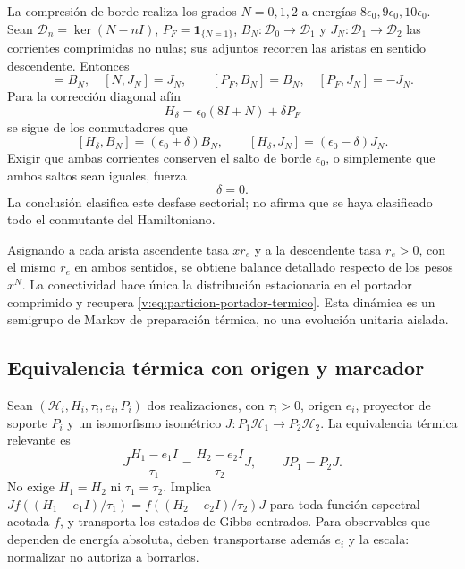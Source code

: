 La compresión de borde realiza los grados $N=0,1,2$ a energías
$8\epsilon_0,9\epsilon_0,10\epsilon_0$. Sean
$\mathcal D_n=\ker(N-nI)$,
$P_F=\mathbf1_{\{N=1\}}$,
$B_N:\mathcal D_0\to\mathcal D_1$ y
$J_N:\mathcal D_1\to\mathcal D_2$ las corrientes comprimidas no nulas;
sus adjuntos recorren las aristas en sentido descendente. Entonces
\begin{equation}
 [N,B_N]=B_N,\quad [N,J_N]=J_N,\qquad
 [P_F,B_N]=B_N,\quad [P_F,J_N]=-J_N.
 \label{v:eq:conmutadores-corrientes-termicas}
\end{equation}
Para la corrección diagonal afín
\[
 H_\delta=\epsilon_0(8I+N)+\delta P_F
\]
se sigue de los conmutadores que
\[
 [H_\delta,B_N]=(\epsilon_0+\delta)B_N,
 \qquad
 [H_\delta,J_N]=(\epsilon_0-\delta)J_N.
\]
Exigir que ambas corrientes conserven el salto de borde $\epsilon_0$, o
simplemente que ambos saltos sean iguales, fuerza
\begin{equation}
 \delta=0.
 \label{v:eq:rigidez-desfase-corrientes}
\end{equation}
La conclusión clasifica este desfase sectorial; no afirma que se haya
clasificado todo el conmutante del Hamiltoniano.

Asignando a cada arista ascendente tasa $xr_e$ y a la descendente tasa
$r_e>0$, con el mismo $r_e$ en ambos sentidos, se obtiene balance detallado
respecto de los pesos $x^N$. La conectividad hace única la distribución
estacionaria en el portador comprimido y recupera
\eqref{v:eq:particion-portador-termico}. Esta dinámica es un semigrupo de
Markov de preparación térmica, no una evolución unitaria aislada.

\subsection{Equivalencia térmica con origen y marcador}

Sean $(\mathscr H_i,H_i,\tau_i,e_i,P_i)$ dos realizaciones, con
$\tau_i>0$, origen $e_i$, proyector de soporte $P_i$ y un isomorfismo
isométrico $J:P_1\mathscr H_1\to P_2\mathscr H_2$. La equivalencia térmica
relevante es
\begin{equation}
 J\frac{H_1-e_1I}{\tau_1}
 =\frac{H_2-e_2I}{\tau_2}J,\qquad
 JP_1=P_2J.
 \label{v:eq:equivalencia-termica-centrada}
\end{equation}
No exige $H_1=H_2$ ni $\tau_1=\tau_2$. Implica
$Jf((H_1-e_1I)/\tau_1)=f((H_2-e_2I)/\tau_2)J$ para toda función espectral
acotada $f$, y transporta los estados de Gibbs centrados. Para observables
que dependen de energía absoluta, deben transportarse además $e_i$ y la
escala: normalizar no autoriza a borrarlos.

